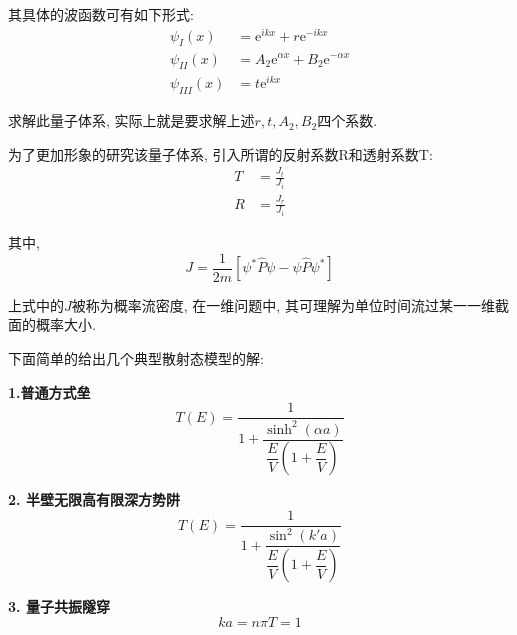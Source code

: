 \documentclass[a4paper, 11pt]{article}
\begin{document}
\begin{spacing}{1.2}
          其具体的波函数可有如下形式:
          \begin{equation}
            \begin{aligned}
              \psi_I(x) &= \mathrm{e}^{ikx} + r\mathrm{e}^{-ikx}\\
              \psi_{II}(x) &= A_2\mathrm{e}^{\alpha{}x}+B_2\mathrm{e}^{-\alpha{}x}\\
              \psi_{III}(x) &= t\mathrm{e}^{ikx}
            \end{aligned}
          \end{equation}
          
          求解此量子体系, 实际上就是要求解上述$r,t,A_2,B_2$四个系数.

          为了更加形象的研究该量子体系, 引入所谓的反射系数R和透射系数T:
          \begin{equation}
            \begin{aligned}
              T &= \frac{J_t}{J_i}\\
              R &= \frac{J_r}{J_i}            
            \end{aligned}
          \end{equation}
           
          其中, 
          \begin{equation}
            \label{J_function}
            J = \frac{1}{2m}\left[\psi^{*}\hat{P}\psi-\psi\hat{P}\psi^{*}\right]    
          \end{equation}


          上式中的$J$被称为概率流密度, 在一维问题中, 其可理解为单位时间流过某一一维截面的概率大小.

          下面简单的给出几个典型散射态模型的解:

          \textbf{1.普通方式垒}
          \begin{equation}
            T(E) = \dfrac{1}{1+\dfrac{\sinh^2(\alpha{}a)}{\dfrac{E}{V}\left(1+\dfrac{E}{V}\right)}}
          \end{equation}
          
          \textbf{2. 半壁无限高有限深方势阱}
          \begin{equation}
            T(E) = \dfrac{1}{1+\dfrac{\sin^2(k'a)}{\dfrac{E}{V}\left(1+\dfrac{E}{V}\right)}}
          \end{equation}
          
          \textbf{3. 量子共振隧穿}
            \begin{equation}
              ka = n\pi{}T = 1
            \end{equation}


\end{spacing}
\end{document}

